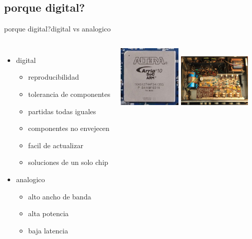  \subsection{porque digital?}
 \begin{frame}{porque digital?}{digital vs analogico}
    \begin{columns}[onlytextwidth]
       \begin{itemize}
          \item{digital}
             \begin{itemize}
                \item{reproducibilidad}
                \item{tolerancia de componentes}
                \item{partidas todas iguales}
                \item{componentes no envejecen}
                \item{facil de actualizar}
                \item{soluciones de un solo chip}
             \end{itemize}
          \item{analogico}
             \begin{itemize}
                \item{alto ancho de banda}
                \item{alta potencia}
                \item{baja latencia}
             \end{itemize}
       \end{itemize}
       \includegraphics[width=30mm]{1_clase/fpga}
       \newline
       \includegraphics[width=35mm]{1_clase/transistor_amp}
    \end{columns}
 \end{frame}

